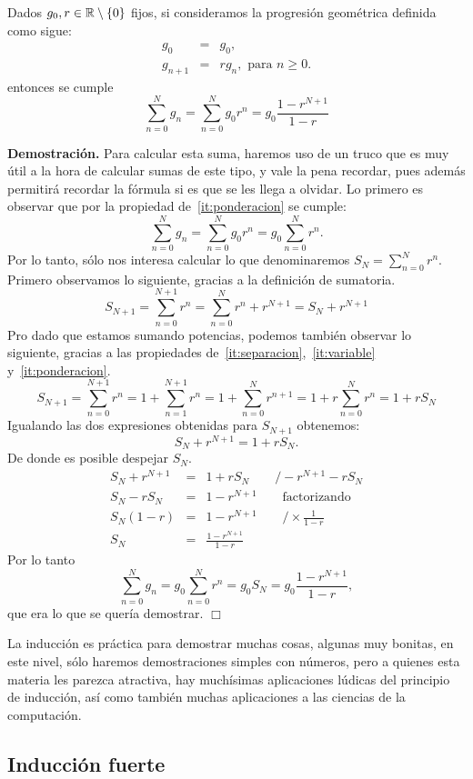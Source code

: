 \begin{prop}
Dados $g_0, r\in\mathbb{R}\setminus\{0\}$ fijos, si consideramos la  progresión geométrica definida como sigue:
\begin{eqnarray*}
g_0&=&g_0,\\
g_{n+1}&=&rg_n,\textrm{ para }n\ge0.
\end{eqnarray*}
entonces se cumple
$$\sum_{n=0}^Ng_n=\sum_{n=0}^Ng_0r^n=g_0\frac{1-r^{N+1}}{1-r}$$
\end{prop}
{\bf Demostración.}
Para calcular esta suma, haremos uso de un truco que es muy útil a la hora de calcular sumas de este tipo, y vale la pena recordar, pues además permitirá recordar la fórmula si es que se les llega a olvidar.
Lo primero es observar que por la propiedad de~\ref{it:ponderacion} se cumple:
$$\sum_{n=0}^Ng_n=\sum_{n=0}^Ng_0r^n=g_0\sum_{n=0}^Nr^n.$$
Por lo tanto, sólo nos interesa calcular lo que denominaremos ${\displaystyle S_N=\sum_{n=0}^Nr^n}$.\\
Primero observamos lo siguiente, gracias a la definición de sumatoria.
$$S_{N+1}=\sum_{n=0}^{N+1}r^n=\sum_{n=0}^Nr^n+r^{N+1}=S_N+r^{N+1}$$
Pro dado que estamos sumando potencias, podemos también observar lo siguiente, gracias a las propiedades de~\ref{it:separacion},~\ref{it:variable} y~\ref{it:ponderacion}.
$$S_{N+1}=\sum_{n=0}^{N+1}r^n=1+\sum_{n=1}^{N+1}r^n=1+\sum_{n=0}^{N}r^{n+1}=1+r\sum_{n=0}^{N}r^{n}=1+rS_N$$
Igualando las dos expresiones obtenidas para $S_{N+1}$ obtenemos:
$$S_N+r^{N+1}=1+rS_N.$$
De donde es posible despejar $S_N$.
\begin{eqnarray*}
S_N+r^{N+1}&=&1+rS_N\qquad /-r^{N+1}-rS_N\\
S_N-rS_N&=&1-r^{N+1}\qquad \textrm{factorizando}\\
S_N(1-r)&=&1-r^{N+1}\qquad /\times\frac{1}{1-r}\\
S_N&=&\frac{1-r^{N+1}}{1-r}
\end{eqnarray*}
Por lo tanto
$$\sum_{n=0}^Ng_n=g_0\sum_{n=0}^Nr^n=g_0S_N=g_0\frac{1-r^{N+1}}{1-r},$$
que era lo que se quería demostrar.
\hfill $\Box$

La inducción es práctica para demostrar muchas cosas, algunas muy bonitas, en este nivel, sólo haremos demostraciones simples con números, pero a quienes esta materia les parezca atractiva, hay muchísimas aplicaciones lúdicas del principio de inducción, así como también muchas aplicaciones a las ciencias de la computación.



\subsection{Inducción fuerte}

